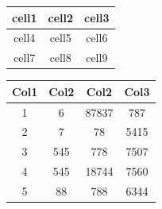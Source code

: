 \documentclass[12pt, letterpaper]{article}
\begin{document}
\begin{center}
\begin{tabular}{|c|c|c|} 
 \hline
 cell1 & cell2 & cell3 \\ 
 \hline
 cell4 & cell5 & cell6 \\ 
 \hline
 cell7 & cell8 & cell9 \\ 
 \hline
\end{tabular}
\end{center}

\begin{center}
 \begin{tabular}{||c c c c||} 
 \hline
 Col1 & Col2 & Col2 & Col3 \\ [0.5ex] 
 \hline\hline
 1 & 6 & 87837 & 787 \\ 
 \hline
 2 & 7 & 78 & 5415 \\
 \hline
 3 & 545 & 778 & 7507 \\
 \hline
 4 & 545 & 18744 & 7560 \\
 \hline
 5 & 88 & 788 & 6344 \\ [1ex] 
 \hline
\end{tabular}
\end{center}

\newpage
  
\tableofcontents
\end{document}
